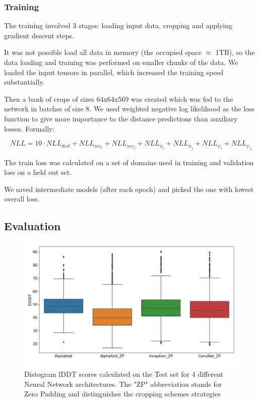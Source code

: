 \subsubsection{Training}

The training involved 3 stages: loading input data, cropping and applying gradient descent steps.

It was not possible load all data in memory (the occupied space $\approx$ 1TB), so the data loading and training was performed on smaller chunks of the data. We loaded the input tensors in parallel, which increased the training speed substantially.

Then a bank of crops of sizes 64x64x569 was created which was fed to the network in batches of size 8. We used weighted negative log likelihood as the loss function to give more importance to the distance predictions than auxiliary losses. Formally:

\begin{equation}
    NLL = 10 \cdot NLL_{dist} + NLL_{sec_i} + NLL_{sec_j} + NLL_{\phi_i} + NLL_{\phi_j} + NLL_{\psi_i} + NLL_{\psi_j}
    \label{eq:NLLloss}
\end{equation}

The train loss was calculated on a set of domains used in training and validation loss on a held out set. 

We saved intermediate models (after each epoch) and picked the one with lowest overall loss. 

\subsection{Evaluation}

\begin{figure}
    \centering
    \includegraphics[width=\linewidth]{imgs_tomas/models_lddt_nice.png}
    \caption{Distogram lDDT scores calculated on the Test set for 4 different Neural Network architectures. The "ZP" abbreviation stands for Zero Padding and distinguishes the cropping schemes strategies}
    \label{fig:models_lddt}
\end{figure}

